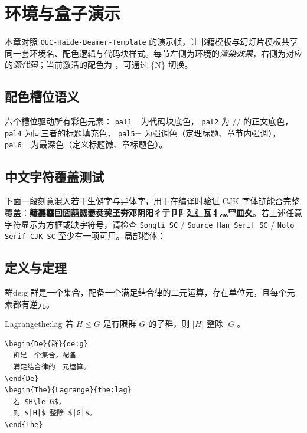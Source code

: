 
\chapter{环境与盒子演示}
\label{ch:showcase}

本章对照 \texttt{OUC-Haide-Beamer-Template} 的演示帧，让书籍模板与幻灯片模板共享同一套环境名、配色逻辑与代码块样式。每节左侧为环境的\emph{渲染效果}，右侧为对应的\emph{源代码}；当前激活的配色为 \texttt{\OUCPaletteName}，可通过 \{N\} 切换。

\section{配色槽位语义}
六个槽位驱动所有彩色元素：
\texttt{pal1}= 为代码块底色，
\texttt{pal2} 为 // 的正文底色，
\texttt{pal4} 为同三者的标题填充色，
\texttt{pal5}= 为强调色（定理标题、章节内强调），
\texttt{pal6}= 为最深色（定义标题徽、章标题色）。

\section{中文字符覆盖测试}

下面一段刻意混入若干生僻字与异体字，用于在编译时验证 CJK 字体链能否完整覆盖：\textbf{齉靐龘囙囧囍嬲嫑烎巭玊夯邓阴阳彳亍卩阝廴辶瓦丬灬罒皿夊}。若上述任意字符显示为方框或缺字符号，请检查 \texttt{Songti SC} / \texttt{Source Han Serif SC} / \texttt{Noto Serif CJK SC} 至少有一项可用。局部楷体：

\section{定义与定理}

\begin{fullwidth}
\begin{minipage}[t]{0.48\linewidth}
\begin{De}{群}{de:g}
群是一个集合，配备一个满足结合律的二元运算，存在单位元，且每个元素都有逆元。
\end{De}
\begin{The}{Lagrange}{the:lag}
若 $H\le G$ 是有限群 $G$ 的子群，则 $|H|$ 整除 $|G|$。
\end{The}
\end{minipage}\hfill
\begin{minipage}[t]{0.48\linewidth}
\begin{lstlisting}[language={[LaTeX]TeX}]
\begin{De}{群}{de:g}
  群是一个集合，配备
  满足结合律的二元运算。
\end{De}
\begin{The}{Lagrange}{the:lag}
  若 $H\le G$，
  则 $|H|$ 整除 $|G|$。
\end{The}
\end{lstlisting}
\end{minipage}
\end{fullwidth}

